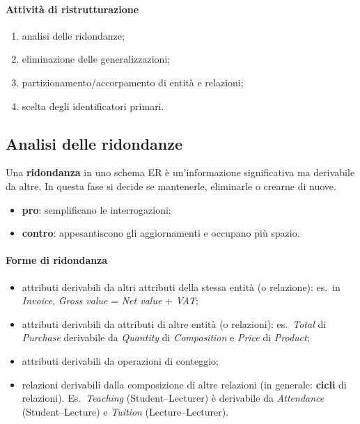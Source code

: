 \documentclass[a4paper,12pt]{article}
\begin{document}
\paragraph{Attività di ristrutturazione}
\begin{enumerate}
  \item analisi delle ridondanze;
  \item eliminazione delle generalizzazioni;
  \item partizionamento/accorpamento di entità e relazioni;
  \item scelta degli identificatori primari.
\end{enumerate}

\subsection{Analisi delle ridondanze}

Una \textbf{ridondanza} in uno schema ER è un'informazione significativa ma
derivabile da altre. In questa fase si decide se mantenerle, eliminarle o
crearne di nuove.
\begin{itemize}
  \item \textbf{pro}: semplificano le interrogazioni;
  \item \textbf{contro}: appesantiscono gli aggiornamenti e occupano più
    spazio.
\end{itemize}

\paragraph{Forme di ridondanza}
\begin{itemize}
  \item attributi derivabili da altri attributi della stessa entità (o
    relazione): es.\ in \emph{Invoice}, \emph{Gross value} = \emph{Net value}
    + \emph{VAT};
  \item attributi derivabili da attributi di altre entità (o relazioni): es.\
    \emph{Total} di \emph{Purchase} derivabile da \emph{Quantity} di
    \emph{Composition} e \emph{Price} di \emph{Product};
  \item attributi derivabili da operazioni di conteggio;
  \item relazioni derivabili dalla composizione di altre relazioni (in
    generale: \textbf{cicli} di relazioni). Es.\ \emph{Teaching}
    (Student--Lecturer) è derivabile da \emph{Attendance} (Student--Lecture) e
    \emph{Tuition} (Lecture--Lecturer).
\end{itemize}
\end{document}
